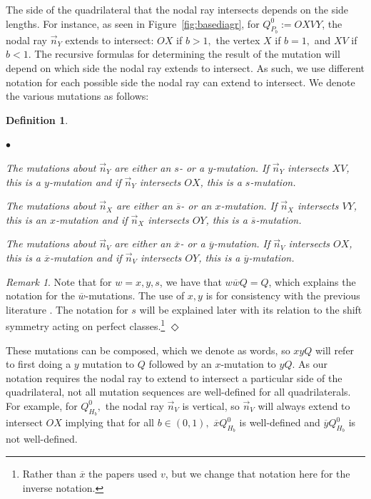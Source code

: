 \documentclass[11pt, reqno]{amsart}
\newtheorem{definition}[thm]{Definition}
\theoremstyle{remark}
\numberwithin{equation}{subsection}
\numberwithin{figure}{section}
\theoremstyle{customremark}
\newtheorem{rmk_no_diamond}[thm]{Remark}
\newenvironment{rmk}{\begin{rmk_no_diamond} } {\hfill$\er$ \end{rmk_no_diamond}}
\newenvironment{itemlist}
   { \begin{list} {$\bullet$}
         { \setlength{\topsep}{.5ex}  \setlength{\itemsep}{.5ex} \setlength{\leftmargin}{2.5ex} } }
   { \end{list} }
\newcommand{\vn}{{\vec{n}}}
\newcommand{\ov}{\overline}
\newcommand{\er}{{\Diamond}}
\begin{document}
The side of the quadrilateral that the nodal ray intersects depends on the side lengths. For instance, as seen in Figure~\ref{fig:basediagr}, for $Q_{P_b}^0:=OXVY$, the nodal ray $\vn_Y$ extends to intersect: $OX$ if $b>1,$ the vertex $X$ if $b=1,$ and $XV$ if $b<1.$ The recursive formulas for determining the result of the mutation will depend on which side the nodal ray extends to intersect. As such, we use different notation for each possible side the nodal ray can extend to intersect. 
We denote the various mutations as follows: 
\begin{definition} \label{def:mutationI}
\begin{itemlist}
    \item[{(i)}] The mutations about $\vn_Y$ are either an $s$- or a $y$-mutation. If $\vn_Y$ intersects $XV$, this is a $y$-mutation and if $\vn_Y$ intersects $OX$, this is a $s$-mutation. 
    \item[{(ii)}] The mutations about $\vn_X$ are either an $\ov{s}$- or an $x$-mutation. If $\vn_X$ intersects $VY$, this is an $x$-mutation and if $\vn_X$ intersects $OY$, this is a $\ov{s}$-mutation. 
    \item[{(iii)}] The mutations about $\vn_V$ are either an $\ov{x}$- or a $\ov{y}$-mutation. If $\vn_V$ intersects $OX$, this is a $\ov{x}$-mutation and if $\vn_V$ intersects $OY$, this is a $\ov{y}$-mutation. 
\end{itemlist}
\end{definition}
\begin{rmk} 
    Note that for $w=x,y,s$, we have that $w\ov{w}Q=Q$, which explains the notation for the $\ov{w}$-mutations. The use of $x,y$ is for consistency with the previous literature \cite{MMW,M1,REU}. The notation for $s$ will be explained later with its relation to the shift symmetry acting on perfect classes.\footnote{Rather than $\ov{x}$ the papers \cite{MMW,M1,REU} used $v$, but we change that notation here for the inverse notation.} 
\end{rmk}
These mutations can be composed, which we denote as words, so $xyQ$ will refer to first doing a $y$ mutation to $Q$ followed by an $x$-mutation to $yQ$.  As our notation requires the nodal ray to extend to intersect a particular side of the quadrilateral, not all mutation sequences are well-defined for all quadrilaterals. For example, for $Q_{H_b}^0,$ the nodal ray $\vn_V$ is vertical, so $\vn_V$ will always extend to intersect $OX$ implying that for all $b \in (0,1),$ $\ov{x}Q_{H_b}^0$ is well-defined and $\ov{y}Q_{H_b}^0$ is not well-defined. 
\end{document}
